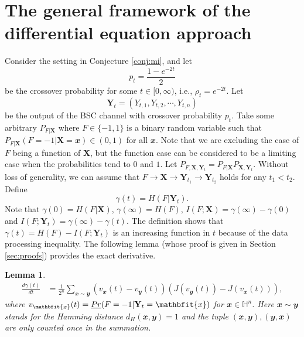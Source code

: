 \documentclass[conference,letterpaper,onecolumn]{IEEEtran}
\theoremstyle{plain}%
\newtheorem{lemma}[thm]{Lemma}
\newcommand{\bY}{\mathbf{Y}}
\newcommand{\by}{\mathbfit{y}}
\newcommand{\bX}{\mathbf{X}}
\newcommand{\bx}{\mathbfit{x}}
\begin{document}
\section{The general framework of the differential equation approach}
\label{sec2}
Consider the setting in Conjecture \ref{conj:mi}, and let $$p_t = \frac{1 - e^{-2t}}{2}$$
be the crossover probability for some $t \in [0,\infty)$, i.e., $\rho_t=e^{-2t}$. Let 
$$\bY_t=(Y_{t,1},Y_{t,2},\cdots, Y_{t,n})$$ 
be the output of the BSC channel with crossover probability $p_t$. %
Take some arbitrary $P_{F|\bX}$ where $F\in \{-1,1\}$ is a binary random variable such that $P_{F|\bX}(F=-1|\bX=\bx)\in(0,1)$ for all $\bx$. Note that we are excluding the case of $F$ being a function of $\bX$, but the function case can be considered to be a limiting case when the probabilities tend to $0$ and $1$. Let $P_{F,\bX,\bY_t}=P_{F|\bX}P_{\bX,\bY_t}$. Without loss of generality, we can assume that $F\rightarrow \bX\rightarrow \bY_{t_1}\rightarrow \bY_{t_2}$ holds for any $t_1<t_2$. Define $$\gamma(t) = H(F|\bY_t).$$
Note that $\gamma(0)=H(F|\bX)$, $\gamma(\infty)=H(F)$, $I(F;\bX)=\gamma(\infty)-\gamma(0)$ and $I(F;\bY_t)=\gamma(\infty)-\gamma(t)$.
 The definition shows that $\gamma(t)=H(F)-I(F;\bY_t)$ is an increasing function in $t$ because of the data processing inequality. 
 The following lemma (whose proof is given in Section \ref{sec:proofs}) provides the exact derivative.
\begin{lemma}\label{lmm1}
    \begin{align*}
        \frac{d\gamma(t)}{dt} &= \frac{1}{2^{n}}\sum_{\bx\sim \by}(v_{\bx}(t) - v_{\by}(t))(J(v_{\by}(t)) - J(v_{\bx}(t))),
    \end{align*}
    where $v_{\bx}(t) = \emph{Pr}(F = -1|\bY_t = \bx)$ for $\bx\in\mathbb{H}^n$. Here $\bx\sim \by$ stands for the Hamming distance $d_H(\bx,\by) = 1$ and the tuple $(\bx,\by),(\by,\bx)$ are only counted once in the summation.
\end{lemma}
\end{document}
